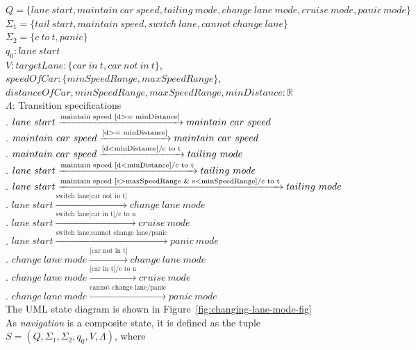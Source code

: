\documentclass[12pt]{article}
\begin{document}
\begin{spacing}{1.5}
\noindent $Q = \{lane~start, maintain~car~speed, tailing~mode, change~lane~mode, cruise~mode, panic~mode\}$\\
\noindent $\Sigma_1 = \{tail~start, maintain~speed, switch~lane, cannot~change~lane\}$\\
\noindent $\Sigma_2 = \{c~to~t, panic\}$\\
\noindent $q_0: lane~start$\\
\noindent $V: targetLane: \{car~in~t, car~not~in~t\}$,\\
\indent $speedOfCar: \{minSpeedRange, maxSpeedRange\},$\\
\indent $distanceOfCar, minSpeedRange, maxSpeedRange, minDistance: \mathbb{R} $\\
\noindent $\Lambda$: Transition specifications\\
. $lane~start\xrightarrow {\text{maintain speed [d\textgreater = minDistance]}} maintain~car~speed$\\
. $maintain~car~speed\xrightarrow {\text{[d\textgreater = minDistance]}} maintain~car~speed$\\
. $maintain~car~speed\xrightarrow {\text{[d\textless minDistance]/c to t}} tailing~mode$\\
. $lane~start\xrightarrow {\text{maintain speed [d\textless minDistance]/c to t}} tailing~mode$\\
. $lane~start\xrightarrow {\text{maintain speed [s\textgreater maxSpeedRange \& s\textless minSpeedRange]/c to t}} tailing~mode$\\
. $lane~start\xrightarrow {\text{switch lane[car not in t]}} change~lane~mode$\\
. $lane~start\xrightarrow {\text{switch lane[car in t]/c to n}} cruise~mode$\\
. $lane~start\xrightarrow {\text{switch lane;cannot change lane/panic}} panic~mode$\\
. $change~lane~mode\xrightarrow {\text{[car not in t]}} change~lane~mode$\\
. $change~lane~mode\xrightarrow {\text{[car in t]/c to n}} cruise~mode$\\
. $change~lane~mode\xrightarrow {\text{cannot change lane/panic}} panic~mode$\\

\noindent The UML state diagram is shown in Figure~\ref{fig:changing-lane-mode-fig}\\


\noindent As \textit{navigation} is a composite state, it is defined as the tuple $S = (Q, \Sigma_1, \Sigma_2, q_0, V, \Lambda)$, where\\


\end{spacing}
\end{document}
